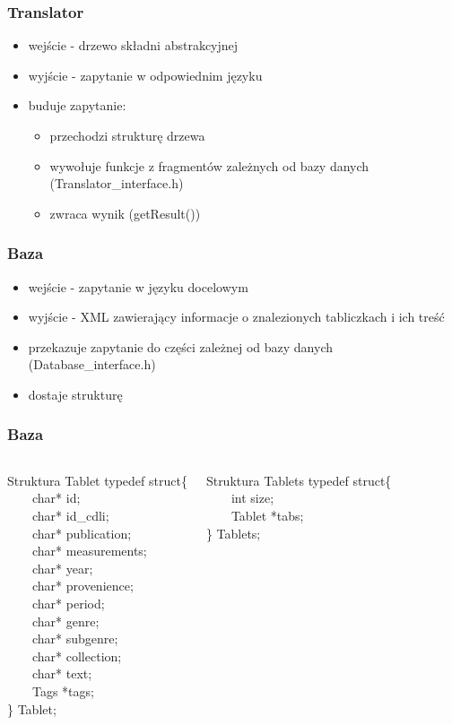 \begin{frame}
\frametitle{Translator}
\begin{itemize}
\item wejście - drzewo składni abstrakcyjnej
\item wyjście - zapytanie w odpowiednim języku
\item buduje zapytanie:
\begin{itemize}
 \item przechodzi strukturę drzewa
 \item wywołuje funkcje z fragmentów zależnych od bazy danych (Translator\_interface.h)
 \item zwraca wynik (getResult())
\end{itemize}
\end{itemize}
\end{frame}


\begin{frame}
     \frametitle{Baza}
\begin{itemize}
\item wejście - zapytanie w języku docelowym
\item wyjście - XML zawierający informacje o znalezionych tabliczkach i ich treść
\item przekazuje zapytanie do części zależnej od bazy danych (Database\_interface.h)
\item dostaje strukturę
\end{itemize}
\end{frame}

\begin{frame}
 \frametitle{Baza}
\begin{columns}[t]
\begin{block}{Struktura Tablet}
typedef struct\{ \\
~~~~char* id; \\
~~~~char* id\_cdli; \\
~~~~char* publication; \\
~~~~char* measurements; \\
~~~~char* year; \\
~~~~char* provenience; \\
~~~~char* period; \\
~~~~char* genre; \\
~~~~char* subgenre; \\
~~~~char* collection; \\
~~~~char* text; \\
~~~~Tags *tags; \\
\} Tablet; \\
\end{block}
\begin{block}{Struktura Tablets}
typedef struct\{ \\
~~~~int size; \\
~~~~Tablet *tabs; \\
\} Tablets;
\end{block}
\end{columns}

\end{frame}
